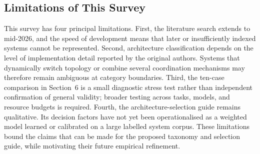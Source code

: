 \subsection{Limitations of This Survey}
\label{sec:survey_limitations}

This survey has four principal limitations. First, the literature search
extends to mid-2026, and the speed of development means that later or
insufficiently indexed systems cannot be represented. Second, architecture
classification depends on the level of implementation detail reported by the
original authors. Systems that dynamically switch topology or combine several
coordination mechanisms may therefore remain ambiguous at category
boundaries. Third, the ten-case comparison in Section~6 is a small diagnostic
stress test rather than independent confirmation of general validity; broader
testing across tasks, models, and resource budgets is required. Fourth, the
architecture-selection guide remains qualitative. Its decision factors have
not yet been operationalised as a weighted model learned or calibrated on a
large labelled system corpus. These limitations bound the claims that can be
made for the proposed taxonomy and selection guide, while motivating their
future empirical refinement.
